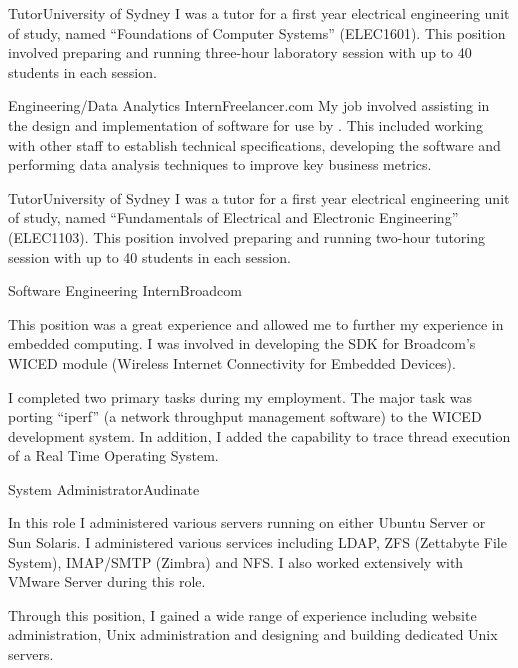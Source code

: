 \begin{professionalExperience}

{Tutor}{University of Sydney}
{I was a tutor for a first year electrical engineering unit of study, named
``Foundations of Computer Systems'' (ELEC1601). This position involved preparing
and running three-hour laboratory session with up to 40 students in each
session.}
{}

{Engineering/Data Analytics Intern}{Freelancer.com}
{My job involved assisting in the design and implementation of software for use
by . This included working with other staff to establish
technical specifications, developing the software and performing data analysis
techniques to improve key business metrics.}

{Tutor}{University of Sydney}
{I was a tutor for a first year electrical engineering unit of study, named
``Fundamentals of Electrical and Electronic Engineering'' (ELEC1103). This
position involved preparing and running two-hour tutoring session with up to 40
students in each session.}

{Software Engineering Intern}{Broadcom}
{This position was a great experience and allowed me to further my experience in
embedded computing. I was involved in developing the SDK for Broadcom's WICED
module (Wireless Internet Connectivity for Embedded Devices).

I completed two primary tasks during my employment. The major task was porting
``iperf'' (a network throughput management software) to the WICED development
system. In addition, I added the capability to trace thread execution of a Real
Time Operating System.}

{System Administrator}{Audinate}
{In this role I administered various servers running on either Ubuntu Server or
Sun Solaris. I administered various services including LDAP, ZFS (Zettabyte File
System), IMAP/SMTP (Zimbra) and NFS. I also worked extensively with VMware
Server during this role.

Through this position, I gained a wide range of experience including website
administration, Unix administration and designing and building dedicated Unix
servers.}


\end{professionalExperience}
